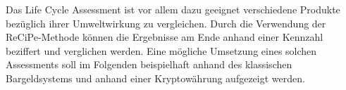 Das Life Cycle Assessment ist vor allem dazu geeignet verschiedene Produkte bezüglich ihrer Umweltwirkung zu vergleichen. Durch die Verwendung der ReCiPe-Methode können die Ergebnisse am Ende anhand einer Kennzahl beziffert und verglichen werden. Eine mögliche Umsetzung eines solchen Assessments soll im Folgenden beispielhaft anhand des klassischen Bargeldsystems und anhand einer Kryptowährung aufgezeigt werden.